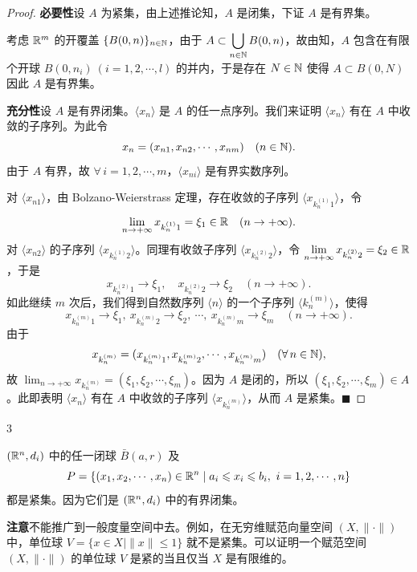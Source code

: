 \begin{proof}

\textbf{必要性}\quad 设 $A$ 为紧集，由上述推论知，$A$ 是闭集，下证 $A$ 是有界集。

考虑 $\mathbb{R}^m$ 的开覆盖 $\{B(0,n)\}_{n\in\mathbb{N}}$，由于 $A\subset\displaystyle\bigcup_{n\in\mathbb{N}}B(0,n)$，故由知，$A$ 包含在有限个开球 $B(0,n_i)\ (i=1,2,\cdots,l)$ 的并内，于是存在 $N\in\mathbb{N}$ 使得 $A\subset B(0,N)$ 因此 $A$ 是有界集。

\textbf{充分性}\quad 设 $A$ 是有界闭集。$\langle x_n\rangle$ 是 $A$ 的任一点序列。我们来证明 $\langle x_n\rangle$ 有在 $A$ 中收敛的子序列。为此令
\[x_n=(x_{n1},x_{n2},\cdots,x_{nm})\quad(n\in\mathbb{N}).\]
由于 $A$ 有界，故 $\forall\,i=1,2,\cdots,m$，$\langle x_{ni}\rangle$ 是有界实数序列。

对 $\langle x_{n1}\rangle$，由 Bolzano-Weierstrass 定理，存在收敛的子序列 $\langle x_{k_n^{(1)}1}\rangle$，令
\[\lim_{n\to+\infty}x_{k_n^{(1)}1}=\xi_1\in\mathbb{R}\quad(n\to+\infty).\]
对 $\langle x_{n2}\rangle$ 的子序列 $\langle x_{k_n^{(1)}2}\rangle$。同理有收敛子序列 $\langle x_{k_n^{(2)}2}\rangle$，令 $\displaystyle\lim_{n\to+\infty}x_{k_n^{(2)}2}=\xi_2\in\mathbb{R}$，于是
\[x_{k_n^{(2)}1}\to\xi_1,\quad x_{k_n^{(2)}2}\to\xi_2\quad(n\to+\infty).\]
如此继续 $m$ 次后，我们得到自然数序列 $\langle n\rangle$ 的一个子序列 $\langle k_n^{(m)}\rangle$，使得
\[x_{k_n^{(m)}1}\to\xi_1,\ x_{k_n^{(m)}2}\to\xi_2,\ \cdots,\ x_{k_n^{(m)}m}\to\xi_m\quad(n\to+\infty).\]
由于
\[x_{k_n^{(m)}}=(x_{k_n^{(m)}1},x_{k_n^{(m)}2},\cdots,x_{k_n^{(m)}m})\quad(\forall\,n\in\mathbb{N}),\]
故 $\displaystyle\lim_{n\to+\infty}x_{k_n^{(m)}}=(\xi_1,\xi_2,\cdots,\xi_m)$。因为 $A$ 是闭的，所以 $(\xi_1,\xi_2,\cdots,\xi_m)\in A$。此即表明 $\langle x_n\rangle$ 有在 $A$ 中收敛的子序列 $\langle x_{k_n^{(m)}}\rangle$，从而 $A$ 是紧集。$\blacksquare$

\end{proof}

\begin{sourceexample}{3}

$(\mathbb{R}^n,d_i)$ 中的任一闭球 $\bar B(a,r)$ 及
\[P=\{(x_1,x_2,\cdots,x_n)\in\mathbb{R}^n\mid a_i\leqslant x_i\leqslant b_i,\ i=1,2,\cdots,n\}\]
都是紧集。因为它们是 $(\mathbb{R}^n,d_i)$ 中的有界闭集。

\end{sourceexample}

\textbf{注意}\quad {}不能推广到一般度量空间中去。例如，在无穷维赋范向量空间 $(X,\|\cdot\|)$ 中，单位球 $V=\{x\in X\mid\|x\|\leqslant1\}$ 就不是紧集。可以证明一个赋范空间 $(X,\|\cdot\|)$ 的单位球 $V$ 是紧的当且仅当 $X$ 是有限维的。

